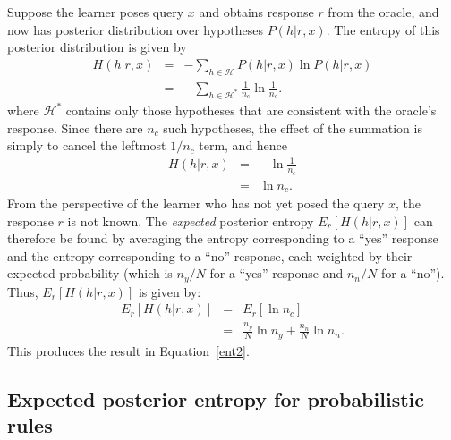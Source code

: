 \documentclass{apa}
\newcommand{\ruleset}{\mathcal{H}}
\newcommand{\p}{P}
\begin{document}
Suppose the learner poses query $x$ and obtains response $r$ from the oracle, and now has posterior distribution over hypotheses $\p(h|r,x)$. The entropy of this posterior distribution is given by
\begin{eqnarray}
H(h|r,x) &=& -\sum_{h \in \ruleset} \p(h|r,x) \ln \p(h|r,x) \\
& = & - \sum_{h \in \ruleset^*} \frac{1}{n_c} \ln \frac{1}{n_c}.
\end{eqnarray}
where $\ruleset^*$ contains only those hypotheses that are consistent with the oracle's response. Since there are $n_c$ such hypotheses, the effect of the summation is simply to cancel the leftmost $1/n_c$ term, and hence
\begin{eqnarray}
H(h|r,x) &=& - \ln \frac{1}{n_c} \\
& = & \ln n_c.
\end{eqnarray}
From the perspective of the learner who has not yet posed the query $x$, the response $r$ is not known. The {\it expected} posterior entropy $E_r[H(h|r,x)]$ can therefore be found by averaging the entropy corresponding to a ``yes'' response and the entropy corresponding to a ``no'' response, each weighted by their expected probability (which is $n_y/N$ for a ``yes'' response and $n_n/N$ for a ``no'').  Thus, $E_r[H(h|r,x)]$ is given by:
\begin{eqnarray}
E_r[H(h|r,x)] &=& E_r[\ln n_c] \\
& = & \frac{n_y}{N} \ln n_y + \frac{n_n}{N} \ln n_n.
\end{eqnarray}
This produces the result in Equation~\ref{ent2}.


\subsection{Expected posterior entropy for probabilistic rules}
\end{document}
